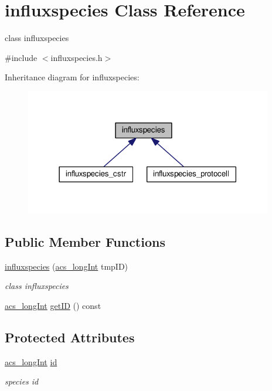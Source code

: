 \hypertarget{a00013}{\section{influxspecies Class Reference}
\label{a00013}
}


class influxspecies  




{\ttfamily \#include $<$influxspecies.\-h$>$}



Inheritance diagram for influxspecies\-:\nopagebreak
\begin{figure}[H]
\begin{center}
\leavevmode
\includegraphics[width=306pt]{a00089}
\end{center}
\end{figure}
\subsection*{Public Member Functions}
\begin{DoxyCompactItemize}
\item 
\hyperlink{a00013_ad387508561a2db60265edf167859f5bb}{influxspecies} (\hyperlink{a00024_a19319d75f02db4308bc5c0026d98cd85}{acs\-\_\-long\-Int} tmp\-I\-D)
\begin{DoxyCompactList}\small\item\em class influxspecies \end{DoxyCompactList}\item 
\hyperlink{a00024_a19319d75f02db4308bc5c0026d98cd85}{acs\-\_\-long\-Int} \hyperlink{a00013_ac619311c01699bbcc00a00961642a6f7}{get\-I\-D} () const 
\end{DoxyCompactItemize}
\subsection*{Protected Attributes}
\begin{DoxyCompactItemize}
\item 
\hyperlink{a00024_a19319d75f02db4308bc5c0026d98cd85}{acs\-\_\-long\-Int} \hyperlink{a00013_a5b4640f6e8c28dfdacd2bddb327d13f2}{id}
\begin{DoxyCompactList}\small\item\em species id \end{DoxyCompactList}\end{DoxyCompactItemize}


